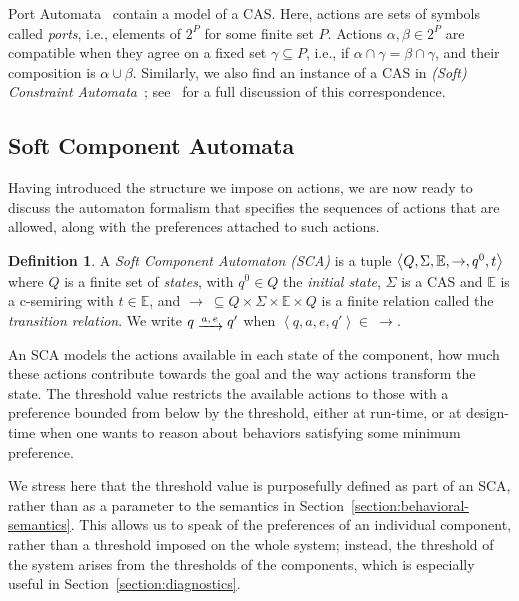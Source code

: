 \documentclass[a4paper]{article}
\newcommand{\angl}[1]{\left\langle#1\right\rangle}
\newcommand{\myrightarrow}[1]{\mathrel{\raisebox{-3pt}{$\xrightarrow{#1}$}}}
\newcommand{\abscsemiring}{\mathbb{E}}
\theoremstyle{definition}
\newtheorem{definition}{Definition}
\begin{document}
Port Automata~\cite{koehler-clarke-2009} contain a model of a CAS\@. Here, actions are sets of symbols called \emph{ports}, i.e., elements of $2^P$ for some finite set $P$. Actions $\alpha, \beta \in 2^P$ are compatible when they agree on a fixed set $\gamma \subseteq P$, i.e., if $\alpha \cap \gamma = \beta \cap \gamma$, and their composition is $\alpha \cup \beta$. Similarly, we also find an instance of a CAS in \emph{(Soft) Constraint Automata}~\cite{baier-sirjani-arbab-rutten-2006,arbab-santini-2013}; see~\cite{kappe-2016-thesis} for a full discussion of this correspondence.

\subsection{Soft Component Automata}
Having introduced the structure we impose on actions, we are now ready to discuss the automaton formalism that specifies the sequences of actions that are allowed, along with the preferences attached to such actions.

\begin{definition}
A \emph{Soft Component Automaton (SCA)} is a tuple $\angl{Q, \mskip-1mu\Sigma, \abscsemiring, \rightarrow, q^0, t}$ where $Q$ is a finite set of \emph{states}, with $q^0 \in Q$ the \emph{initial state}, $\Sigma$ is a CAS and $\abscsemiring$ is a c-semiring with $t \in \abscsemiring$, and $\rightarrow\ \subseteq Q \times \Sigma \times \abscsemiring \times Q$ is a finite relation called the \emph{transition relation}. We write $q \myrightarrow{a,\, e} q'$ when $\angl{q, a, e, q'} \in\ \rightarrow$.
\end{definition}
An SCA models the actions available in each state of the component, how much these actions contribute towards the goal and the way actions transform the state. The threshold value restricts the available actions to those with a preference bounded from below by the threshold, either at run-time, or at design-time when one wants to reason about behaviors satisfying some minimum preference.

We stress here that the threshold value is purposefully defined as part of an SCA, rather than as a parameter to the semantics in Section~\ref{section:behavioral-semantics}. This allows us to speak of the preferences of an individual component, rather than a threshold imposed on the whole system; instead, the threshold of the system arises from the thresholds of the components, which is especially useful in Section~\ref{section:diagnostics}.
\end{document}
